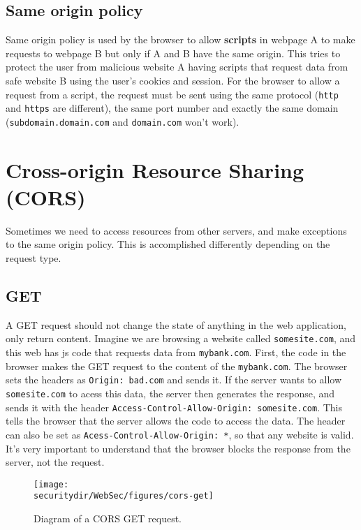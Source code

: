 \subsection{Same origin policy}
Same origin policy is used by the browser to allow \textbf{scripts} in webpage A to make requests to webpage B but only if A and B have the same origin.
This tries to protect the user from malicious website A having scripts that request data from safe website B using the user's cookies and session. For the browser to allow a request from a script, the request must be sent using the same protocol (\verb|http| and \verb|https| are different), the same port number and exactly the same domain (\verb|subdomain.domain.com| and \verb|domain.com| won't work).

\section{Cross-origin Resource Sharing (CORS)}
Sometimes we need to access resources from other servers, and make exceptions to the same origin policy. This is accomplished differently depending on the request type.

\subsection{GET}
A GET request should not change the state of anything in the web application, only return content. 
Imagine we are browsing a website called \verb|somesite.com|, and this web has js code that requests data from \verb|mybank.com|. First, the code in the browser makes the GET request to the content of the \verb|mybank.com|. The browser sets the headers as \verb|Origin: bad.com| and sends it. If the server wants to allow \verb|somesite.com| to acess this data, the server then generates the response, and sends it with the header \verb|Access-Control-Allow-Origin: somesite.com|. This tells the browser that the server allows the code to access the data. The header can also be set as \verb|Acess-Control-Allow-Origin: *|, so that any website is valid. It's very important to understand that the browser blocks the response from the server, not the request.

\begin{figure}[htb]
	\begin{centering}
		\texttt{[image: \\securitydir/WebSec/figures/cors-get]}
		\par\end{centering}
	\caption{\label{fig:ecb} Diagram of a CORS GET request.}
\end{figure}


